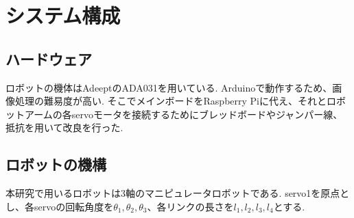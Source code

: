 \chapter{システム構成}
  \label{chap:system}
  \section{ハードウェア}
  	\label{chap:hardware}
 	ロボットの機体はAdeeptのADA031を用いている. Arduinoで動作するため、画像処理の難易度が高い. そこでメインボードをRaspberry Piに代え、それとロボットアームの各servoモータを接続するためにブレッドボードやジャンパー線、抵抗を用いて改良を行った.
  \section{ロボットの機構}
  	\label{chap:mechanism}
	本研究で用いるロボットは3軸のマニピュレータロボットである. servo1を原点とし、各servoの回転角度を$\theta_1, \theta_2, \theta_3$、各リンクの長さを$l_1, l_2, l_3, l_4$とする.
  
